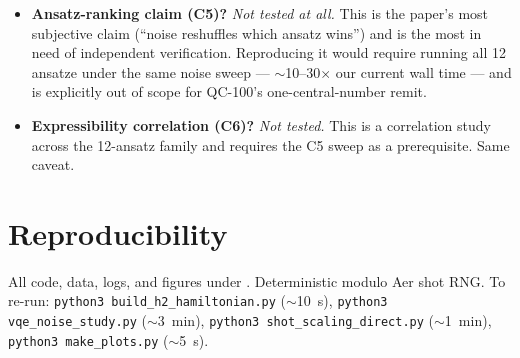 \documentclass[11pt]{article}
\begin{document}
\begin{itemize}
    slope-in-$p$ or the qualitative monotonicity conclusion, but it
    inflates the effective error bar on any single ($p$, $E$) point.
  \item \textbf{Ansatz-ranking claim (C5)?} \emph{Not tested at all.}
    This is the paper's most subjective claim (``noise reshuffles which
    ansatz wins'') and is the most in need of independent verification.
    Reproducing it would require running all 12 ansatze under the same
    noise sweep --- $\sim$10--30$\times$ our current wall time --- and
    is explicitly out of scope for QC-100's one-central-number remit.
  \item \textbf{Expressibility correlation (C6)?} \emph{Not tested.}
    This is a correlation study across the 12-ansatz family and requires
    the C5 sweep as a prerequisite. Same caveat.
\end{itemize}

\section{Reproducibility}
All code, data, logs, and figures under
.
Deterministic modulo Aer shot RNG. To re-run: \texttt{python3 build\_h2\_hamiltonian.py}
($\sim$10~s), \texttt{python3 vqe\_noise\_study.py} ($\sim$3~min),
\texttt{python3 shot\_scaling\_direct.py} ($\sim$1~min),
\texttt{python3 make\_plots.py} ($\sim$5~s).


\end{document}

